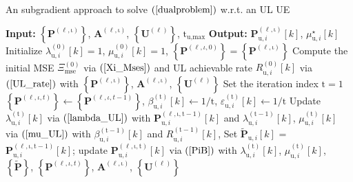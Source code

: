 \documentclass[9pt,journal]{IEEEtran}
\newcommand{\paren}[1]{\left({#1}\right)}
\newcommand{\bracket}[1]{{\left [{#1}\right ]}}
\newcommand{\braces}[1]{{\left\{ {#1}\right\}}}
\newcommand{\sfrac}[2]{#1/#2}
\begin{document}
\begin{algorithm}[ht!]
\caption{An subgradient approach to solve $\paren{\ref{dualproblem}}$ w.r.t. an UL UE}
\label{ULalgorithm}
\begin{algorithmic}[1]
\Statex \textbf{Input: } $\braces{\mathbf{P}^{\paren{\mathrm{\ell,\iota}}}}$,  $\mathbf{A}^{\paren{\mathrm{\ell,\iota}}}$, $\braces{\mathbf{U}^{\paren{\mathrm{\ell}}}}$, $\mathrm{t}_{\textrm{u,max}}$
\Statex \textbf{Output:} $\mathbf{P}^{\paren{\mathrm{\ell,\iota}}}_{\textrm{u},i}\bracket{k}$, $\mu^\star_{\textrm{u},i}\bracket{k}$
\State Initialize $\lambda^{\paren{\mathrm{0}}}_{\textrm{u},i}\bracket{k}=1$, $\mu^{\paren{\mathrm{0}}}_{\textrm{u},i}\bracket{k}=1$, $\braces{\mathbf{P}^{\paren{\ell,\iota,0}}}=\braces{\mathbf{P}^{\paren{\mathrm{\ell,\iota}}}}$ 
\State Compute the initial MSE $\Xi^{\paren{\mathrm{0}}}_{\textrm{mse}}$ via $\paren{\ref{Xi_Mses}}$ and UL achievable rate $\mathit{R}^{\paren{\mathrm{0}}}_{\textrm{u},i}\bracket{k}$ via $\mathrm{\paren{\ref{UL_rate}}}$ with $\braces{\mathbf{P}^{\paren{\mathrm{\ell,\iota}}}}$,  $\mathbf{A}^{\paren{\mathrm{\ell,\iota}}}$, $\braces{\mathbf{U}^{\paren{\mathrm{\ell}}}}$
\State Set the iteration index $\mathrm{t}=1$
\Repeat
\State $\braces{\mathbf{P}^{\paren{\ell,\iota,t}}}\leftarrow\braces{\mathbf{P}^{\paren{\ell,\iota,t-1}}}$, $\beta^{\paren{\mathrm{t}}}_{\textrm{u},i}\bracket{k}\leftarrow\sfrac{1}{\mathrm{t}}$, $\varepsilon^{\paren{\mathrm{t}}}_{\textrm{u},i}\bracket{k}\leftarrow\sfrac{1}{\mathrm{t}}$
\State Update $\lambda^{\paren{\mathrm{t}}}_{\textrm{u},i}\bracket{k}$ via $\mathrm{\paren{\ref{lambda_UL}}}$ with $\mathbf{P}^{\paren{\mathrm{\ell,\iota,t-1}}}_{\textrm{u},i}\bracket{k}$ and $\lambda^{\paren{\mathrm{t-1}}}_{\textrm{u},i}\bracket{k}$, $\mu^{\paren{\mathrm{t}}}_{\textrm{u},i}\bracket{k}$ via $\mathrm{\paren{\ref{mu_UL}}}$ with $\beta^{\paren{\mathrm{t-1}}}_{\textrm{u},i}\bracket{k}$ and $\mathit{R}^{\paren{\mathrm{t-1}}}_{\textrm{u},i}\bracket{k}$, 
\State Set $\widetilde{\mathbf{P}}_{\textrm{u},i}\bracket{k}$ = $\mathbf{P}^{\paren{\mathrm{\ell,\iota,t-1}}}_{\textrm{u},i}\bracket{k}$; update $\mathbf{P}^{\paren{\mathrm{\ell,\iota,t}}}_{\textrm{u},i}\bracket{k}$ via $\mathrm{\paren{\ref{PiB}}}$ with $\lambda^{\paren{\mathrm{t}}}_{\textrm{u},i}\bracket{k}$, $\mu^{\paren{\mathrm{t}}}_{\textrm{u},i}\bracket{k}$, $\braces{\widetilde{\mathbf{P}}}$, $\braces{\mathbf{P}^{\paren{\ell,\iota,t}}}$, $\mathbf{A}^{\paren{\mathrm{\ell,\iota}}}$, $\braces{\mathbf{U}^{\paren{\mathrm{\ell}}}}$

\end{algorithmic}
\end{algorithm}
\end{document}
